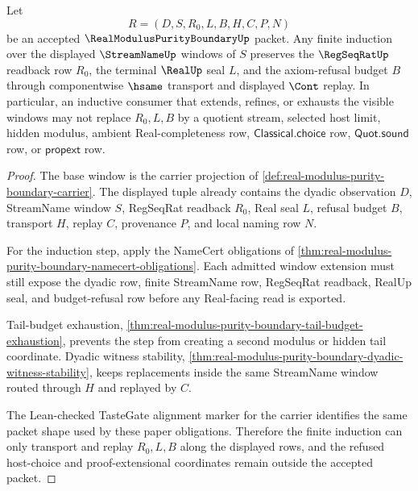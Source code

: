 \begin{theorem}
\label{thm:real-modulus-purity-boundary-regseqrat-readback-induction}
Let
$$
R=(D,S,R_0,L,B,H,C,P,N)
$$
be an accepted $\RealModulusPurityBoundaryUp$ packet. Any finite induction over the displayed $\StreamNameUp$ windows of $S$ preserves the $\RegSeqRatUp$ readback row $R_0$, the terminal $\RealUp$ seal $L$, and the axiom-refusal budget $B$ through componentwise $\hsame$ transport and displayed $\Cont$ replay. In particular, an inductive consumer that extends, refines, or exhausts the visible windows may not replace $R_0,L,B$ by a quotient stream, selected host limit, hidden modulus, ambient Real-completeness row, $\mathsf{Classical.choice}$ row, $\mathsf{Quot.sound}$ row, or $\mathsf{propext}$ row.
\end{theorem}
\begin{proof}
The base window is the carrier projection of \autoref{def:real-modulus-purity-boundary-carrier}. The displayed tuple already contains the dyadic observation $D$, StreamName window $S$, RegSeqRat readback $R_0$, Real seal $L$, refusal budget $B$, transport $H$, replay $C$, provenance $P$, and local naming row $N$.

For the induction step, apply the NameCert obligations of \autoref{thm:real-modulus-purity-boundary-namecert-obligations}. Each admitted window extension must still expose the dyadic row, finite StreamName row, RegSeqRat readback, RealUp seal, and budget-refusal row before any Real-facing read is exported.

Tail-budget exhaustion, \autoref{thm:real-modulus-purity-boundary-tail-budget-exhaustion}, prevents the step from creating a second modulus or hidden tail coordinate. Dyadic witness stability, \autoref{thm:real-modulus-purity-boundary-dyadic-witness-stability}, keeps replacements inside the same StreamName window routed through $H$ and replayed by $C$.

The Lean-checked TasteGate alignment marker for the carrier identifies the same packet shape used by these paper obligations. Therefore the finite induction can only transport and replay $R_0,L,B$ along the displayed rows, and the refused host-choice and proof-extensional coordinates remain outside the accepted packet.
\end{proof}

